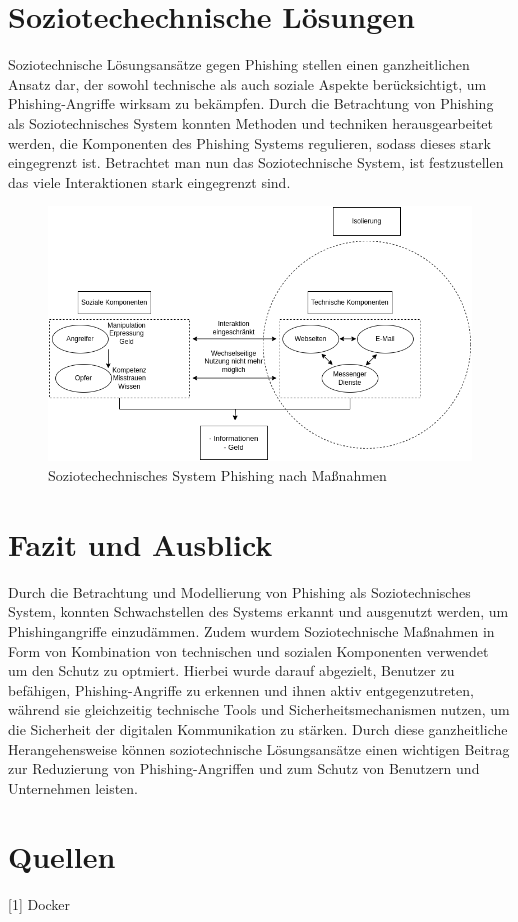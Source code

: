 \documentclass[journal=tosc,final]{iacrtrans}
\begin{document}
\section{Soziotechechnische Lösungen}
Soziotechnische Lösungsansätze gegen Phishing stellen einen ganzheitlichen Ansatz dar, der sowohl technische als auch soziale Aspekte berücksichtigt, um Phishing-Angriffe wirksam zu bekämpfen.
Durch die Betrachtung von Phishing als Soziotechnisches System konnten Methoden und techniken herausgearbeitet werden, die Komponenten des Phishing Systems regulieren, sodass dieses stark eingegrenzt ist. Betrachtet man nun das Soziotechnische System, ist festzustellen das viele Interaktionen stark eingegrenzt sind.
\begin{figure}[h]
 \caption{Soziotechechnisches System Phishing nach Maßnahmen}
 \centering \includegraphics[scale=0.5]{iso.png}
\end{figure}

\section{Fazit und Ausblick}
Durch die Betrachtung und Modellierung von Phishing als Soziotechnisches System, konnten Schwachstellen des Systems erkannt und ausgenutzt werden, um Phishingangriffe einzudämmen. Zudem wurdem Soziotechnische Maßnahmen in Form von Kombination von technischen und sozialen Komponenten verwendet um den Schutz zu optmiert. Hierbei wurde darauf abgezielt, Benutzer zu befähigen, Phishing-Angriffe zu erkennen und ihnen aktiv entgegenzutreten, während sie gleichzeitig technische Tools und Sicherheitsmechanismen nutzen, um die Sicherheit der digitalen Kommunikation zu stärken. Durch diese ganzheitliche Herangehensweise können soziotechnische Lösungsansätze einen wichtigen Beitrag zur Reduzierung von Phishing-Angriffen und zum Schutz von Benutzern und Unternehmen leisten.
\newpage
\section{Quellen}
[1] Docker
\end{document}
